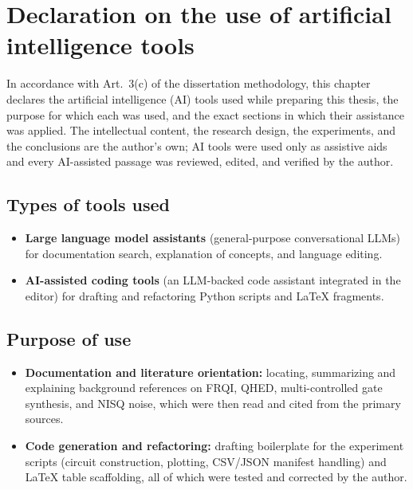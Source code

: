 \chapter*{Declaration on the use of artificial intelligence tools}
\label{ch:ai-declaration}
\thispagestyle{pagestyle}

In accordance with Art.~3(c) of the dissertation methodology, this chapter declares the artificial intelligence (AI) tools used while preparing this thesis, the purpose for which each was used, and the exact sections in which their assistance was applied. The intellectual content, the research design, the experiments, and the conclusions are the author's own; AI tools were used only as assistive aids and every AI-assisted passage was reviewed, edited, and verified by the author.

\section*{Types of tools used}
\begin{itemize}[noitemsep]
  \item \textbf{Large language model assistants} (general-purpose conversational LLMs) for documentation search, explanation of concepts, and language editing.
  \item \textbf{AI-assisted coding tools} (an LLM-backed code assistant integrated in the editor) for drafting and refactoring Python scripts and \LaTeX{} fragments.
\end{itemize}

\section*{Purpose of use}
\begin{itemize}[noitemsep]
  \item \textbf{Documentation and literature orientation:} locating, summarizing and explaining background references on FRQI, QHED, multi-controlled gate synthesis, and NISQ noise, which were then read and cited from the primary sources.
  \item \textbf{Code generation and refactoring:} drafting boilerplate for the experiment scripts (circuit construction, plotting, CSV/JSON manifest handling) and \LaTeX{} table scaffolding, all of which were tested and corrected by the author.
\end{itemize}

